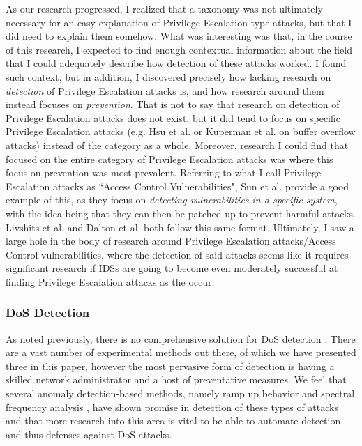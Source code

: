 \documentclass{acm_proc_article-sp}
\begin{document}
    	As our research progressed, I realized that a taxonomy was not ultimately necessary for an easy explanation of Privilege Escalation type attacks, but that I did need to explain them somehow. What was interesting was that, in the course of this research, I expected to find enough contextual information about the field that I could adequately describe how detection of these attacks worked. I found such context, but in addition, I discovered precisely how lacking research on \emph{detection} of Privilege Escalation attacks is, and how research around them instead focuses on \emph{prevention}. That is not to say that research on detection of Privilege Escalation attacks does not exist, but it did tend to focus on specific Privilege Escalation attacks (e.g. Hsu et al. \cite{Hsu2006} or Kuperman et al. \cite{Kuperman2005} on buffer overflow attacks) instead of the category as a whole. Moreover, research I could find that focused on the entire category of Privilege Escalation attacks was where this focus on prevention was most prevalent. Referring to what I call Privilege Escalation attacks as ``Access Control Vulnerabilities", Sun et al. \cite{Sun2011} provide a good example of this, as they focus on \emph{detecting vulnerabilities in a specific system}, with the idea being that they can then be patched up to prevent harmful attacks. Livshits et al. \cite{Livshits2005} and Dalton et al. \cite{Dalton2009} both follow this same format. Ultimately, I saw a large hole in the body of research around Privilege Escalation attacks/Access Control vulnerabilities, where the detection of said attacks seems like it requires significant research if IDSs are going to become even moderately successful at finding Privilege Escalation attacks as the occur.
    	\subsubsection{DoS Detection}
    	As noted previously, there is no comprehensive solution for DoS detection \cite{Specht2004}. There are a vast number of experimental methods out there, of which we have presented three in this paper, however the most pervasive form of detection is having a skilled network administrator and a host of preventative measures. We feel that several anomaly detection-based methods, namely ramp up behavior and spectral frequency analysis \cite{Hussain2003}, have shown promise in detection of these types of attacks and that more research into this area is vital to be able to automate detection and thus defenses against DoS attacks.
\end{document}
